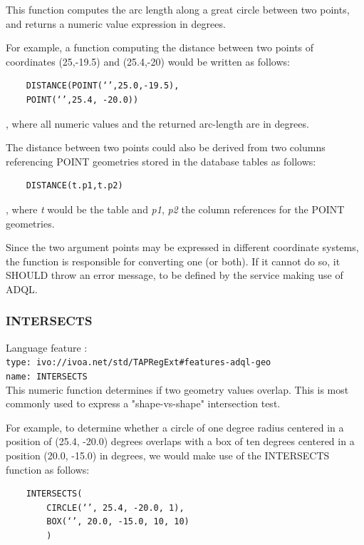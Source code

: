 \documentclass[11pt,a4paper]{ivoa}
\begin{document}
This function computes the arc length along a great circle between two points,
and returns a numeric value expression in degrees.

For example, a function computing the distance between two points of
coordinates (25,-19.5) and (25.4,-20) would be written as follows:

\begin{verbatim}
    DISTANCE(POINT(‘’,25.0,-19.5),
    POINT(‘’,25.4, -20.0))
\end{verbatim}

, where all numeric values and the returned arc-length are in degrees.

The distance between two points could also be derived from two columns
referencing POINT geometries stored in the database tables as follows:

\begin{verbatim}
    DISTANCE(t.p1,t.p2)
\end{verbatim}

, where \textit{t} would be the table and \textit{p1}, \textit{p2} the column
references for the POINT geometries.

Since the two argument points may be expressed in different coordinate systems,
the function is responsible for converting one (or both). If it cannot do
so, it SHOULD throw an error message, to be defined by the service making
use of ADQL.

\subsubsection{INTERSECTS}
\label{sec:geom.functions.intersects}
{\footnotesize Language feature :}\\
{\footnotesize \verb|type: ivo://ivoa.net/std/TAPRegExt#features-adql-geo|}\\
{\footnotesize \verb|name: INTERSECTS|}\\

This numeric function determines if two geometry values overlap. This is
most commonly used to express a "shape-vs-shape" intersection test.

For example, to determine whether a circle of one degree radius centered
in a position of (25.4, -20.0) degrees overlaps with a box of ten degrees
centered in a position (20.0, -15.0) in degrees, we would make use of the
INTERSECTS function as follows:

\begin{verbatim}
    INTERSECTS(
        CIRCLE(‘’, 25.4, -20.0, 1),
        BOX(‘’, 20.0, -15.0, 10, 10)
        )
\end{verbatim}
\end{document}
